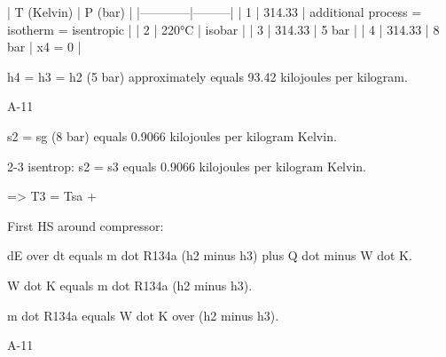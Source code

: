| T (Kelvin) | P (bar) |
|------------|---------|
| 1 | 314.33 | additional process = isotherm = isentropic |
| 2 | 220°C  | isobar |
| 3 | 314.33 | 5 bar |
| 4 | 314.33 | 8 bar | x4 = 0 |

h4 = h3 = h2 (5 bar) approximately equals 93.42 kilojoules per kilogram.

A-11

s2 = sg (8 bar) equals 0.9066 kilojoules per kilogram Kelvin.

2-3 isentrop: s2 = s3 equals 0.9066 kilojoules per kilogram Kelvin.

=> T3 = Tsa + 

First HS around compressor:

dE over dt equals m dot R134a (h2 minus h3) plus Q dot minus W dot K.

W dot K equals m dot R134a (h2 minus h3).

m dot R134a equals W dot K over (h2 minus h3).

A-11
